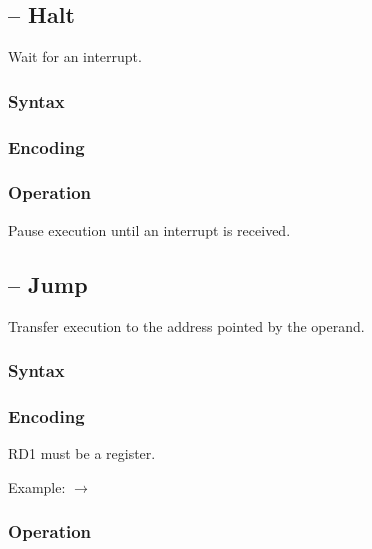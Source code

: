\documentclass[a4paper,12pt,twoside,extrafontsizes]{memoir}
\begin{document}
{\subsection{ -- Halt}
\label{subsec:instr:hlt}

Wait for an interrupt.

\subsubsection{Syntax}


\subsubsection{Encoding}


\subsubsection{Operation}

Pause execution until an interrupt is received.

\subsection{ -- Jump}
\label{subsec:instr:jmp}

Transfer execution to the address pointed by the operand.

\subsubsection{Syntax}


\subsubsection{Encoding}


RD1 must be a register.

Example:  $\rightarrow$ 

\subsubsection{Operation}


}
\end{document}
